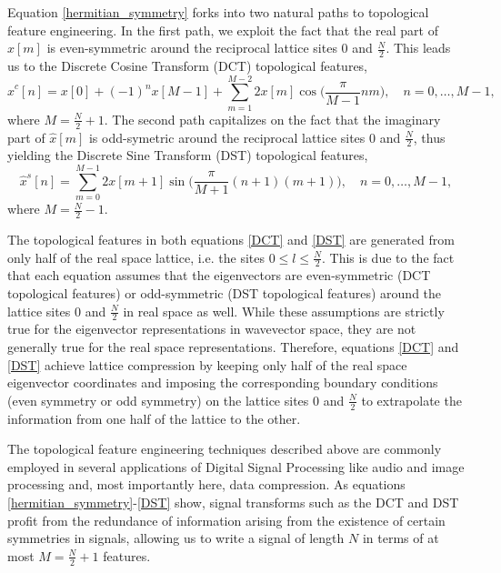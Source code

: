 \documentclass[10pt]{revtex4-1}
\begin{document}
Equation \eqref{hermitian_symmetry} forks into two natural paths to topological feature engineering. In the first path, we exploit the fact that the real part of $\hat{x}[m]$ is even-symmetric around the reciprocal lattice sites $0$ and $\frac{N}{2}$. This leads us to the Discrete Cosine Transform (DCT) topological features,
\begin{equation}
\label{DCT}
\hat{x}^{c}[n] = x[0] + (-1)^n x[M-1] + \sum_{m=1}^{M-2} 2x[m]\cos\bigg(\frac{\pi}{M-1}nm\bigg), \quad n=0,\dots,M-1, 
\end{equation}
where $M = \frac{N}{2}+1$. The second path capitalizes on the fact that the imaginary part of $\hat{x}[m]$ is odd-symetric around the reciprocal lattice sites $0$ and $\frac{N}{2}$, thus yielding the Discrete Sine Transform (DST) topological features,
\begin{equation}
\label{DST}
\hat{x}^{s}[n] = \sum_{m=0}^{M-1} 2x[m+1]\sin\bigg(\frac{\pi}{M+1}(n+1)(m+1)\bigg), \quad n=0,\dots,M-1,
\end{equation} 
where $M = \frac{N}{2}-1$. 

The topological features in both equations \eqref{DCT} and \eqref{DST} are generated from only half of the real space lattice, i.e. the sites $0 \leq l \leq \frac{N}{2}$. This is due to the fact that each equation assumes that the eigenvectors are even-symmetric (DCT topological features) or odd-symmetric (DST topological features) around the lattice sites $0$ and $\frac{N}{2}$ in real space as well. While these assumptions are strictly true for the eigenvector representations in wavevector space, they are not generally true for the real space representations. Therefore, equations \eqref{DCT} and \eqref{DST} achieve lattice compression by keeping only half of the real space eigenvector coordinates and imposing the corresponding boundary conditions (even symmetry or odd symmetry) on the lattice sites $0$ and $\frac{N}{2}$ to extrapolate the information from one half of the lattice to the other. 

The topological feature engineering techniques described above are commonly employed in several applications of Digital Signal Processing like audio and image processing and, most importantly here, data compression. As equations \eqref{hermitian_symmetry}-\eqref{DST} show, signal transforms such as the DCT and DST profit from the redundance of information arising from the existence of certain symmetries in signals, allowing us to write a signal of length $N$ in terms of at most $M = \frac{N}{2}+1$ features. 
   
\end{document}
